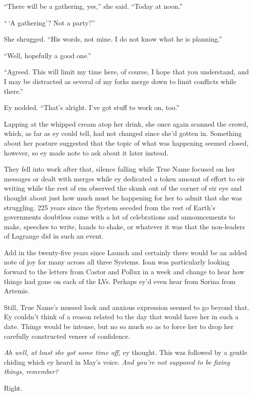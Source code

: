 ``There will be a gathering, yes,'' she said. ``Today at noon.''

``\,`A gathering'? Not a party?''

She shrugged. ``His words, not mine. I do not know what he is planning.''

``Well, hopefully a good one.''

``Agreed. This will limit my time here, of course, I hope that you understand, and I may be distracted as several of my forks merge down to limit conflicts while there.''

Ey nodded. ``That's alright. I've got stuff to work on, too.''

Lapping at the whipped cream atop her drink, she once again scanned the crowd, which, as far as ey could tell, had not changed since she'd gotten in. Something about her posture suggested that the topic of what was happening seemed closed, however, so ey made note to ask about it later instead.

They fell into work after that, silence falling while True Name focused on her messages or dealt with merges while ey dedicated a token amount of effort to eir writing while the rest of em observed the skunk out of the corner of eir eye and thought about just how much must be happening for her to admit that she was struggling. 225 years since the System seceded from the rest of Earth's governments doubtless came with a lot of celebrations and announcements to make, speeches to write, hands to shake, or whatever it was that the non-leaders of Lagrange did in such an event.

Add in the twenty-five years since Launch and certainly there would be an added note of joy for many across all three Systems. Ioan was particularly looking forward to the letters from Castor and Pollux in a week and change to hear how things had gone on each of the LVs. Perhaps ey'd even hear from Sorina from Artemis.

Still, True Name's mussed look and anxious expression seemed to go beyond that. Ey couldn't think of a reason related to the day that would have her in such a date. Things would be intense, but no so much so as to force her to drop her carefully constructed veneer of confidence.

\emph{Ah well, at least she got some time off,} ey thought. This was followed by a gentle chiding which ey heard in May's voice. \emph{And you're not supposed to be fixing things, remember?}

Right.

